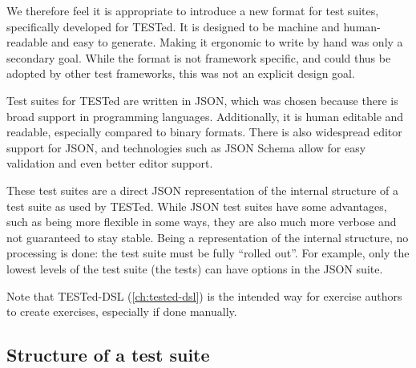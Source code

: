 \documentclass[../main]{subfiles}
\begin{document}
We therefore feel it is appropriate to introduce a new format for test suites, specifically developed for TESTed.
It is designed to be machine and human-readable and easy to generate.
Making it ergonomic to write by hand was only a secondary goal.
While the format is not framework specific, and could thus be adopted by other test frameworks, this was not an explicit design goal.

Test suites for TESTed are written in JSON, which was chosen because there is broad support in programming languages.
Additionally, it is human editable and readable, especially compared to binary formats.
There is also widespread editor support for JSON, and technologies such as JSON Schema allow for easy validation and even better editor support.

These test suites are a direct JSON representation of the internal structure of a test suite as used by TESTed.
While JSON test suites have some advantages, such as being more flexible in some ways, they are also much more verbose and not guaranteed to stay stable.
Being a representation of the internal structure, no processing is done: the test suite must be fully ``rolled out''.
For example, only the lowest levels of the test suite (the tests) can have options in the JSON suite.

Note that TESTed-DSL (\vref{ch:tested-dsl}) is the intended way for exercise authors to create exercises, especially if done manually.

\subsection{Structure of a test suite}\label{subsec:structure-of-a-test-suite}

\end{document}
